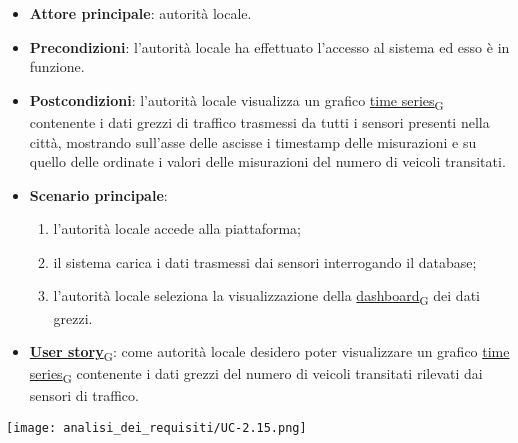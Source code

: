 \newpage
{}
\begin{itemize}
	\item \textbf{Attore principale}: autorità locale.
	\item \textbf{Precondizioni}: l'autorità locale ha effettuato l'accesso al sistema ed esso è in funzione.
	\item \textbf{Postcondizioni}: l'autorità locale visualizza un grafico \href{https://7last.github.io/docs/pb/documentazione-interna/glossario\#time-series}{time series\textsubscript{G}} contenente i dati grezzi di traffico trasmessi da tutti i sensori presenti nella città, mostrando sull'asse delle ascisse i timestamp delle misurazioni e su quello delle ordinate i valori delle misurazioni del numero di veicoli transitati.
	\item \textbf{Scenario principale}:
	      \begin{enumerate}
		      \item l'autorità locale accede alla piattaforma;
		      \item il sistema carica i dati trasmessi dai sensori interrogando il database;
		      \item l'autorità locale seleziona la visualizzazione della \href{https://7last.github.io/docs/pb/documentazione-interna/glossario\#dashboard}{dashboard\textsubscript{G}} dei dati grezzi.
	      \end{enumerate}
	\item \href{https://7last.github.io/docs/pb/documentazione-interna/glossario\#user-story}{\textbf{User story}\textsubscript{G}}:
	      come autorità locale desidero poter visualizzare un grafico \href{https://7last.github.io/docs/pb/documentazione-interna/glossario\#time-series}{time series\textsubscript{G}} contenente i dati grezzi del numero di veicoli transitati rilevati dai sensori di traffico.
\end{itemize}
\begin{center}
	\texttt{[image: analisi\_dei\_requisiti/UC-2.15.png]}
\end{center}

